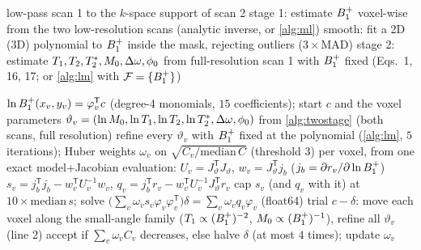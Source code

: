 \begin{algorithm}[!htbp]
\caption{Two-stage reconstruction for a low-resolution scan 2}
\label{alg:twostage}
\begin{algorithmic}[1]
\State low-pass scan 1 to the $k$-space support of scan 2
\State stage 1: estimate $\Bone$ voxel-wise from the two low-resolution scans (analytic inverse, or \cref{alg:ml})
\State smooth: fit a 2D (3D) polynomial to $\Bone$ inside the mask, rejecting outliers ($3\times$MAD)
\State stage 2: estimate $T_1,T_2,T_2^{*},M_0,\Delta\omega,\phi_0$ from full-resolution scan 1 with $\Bone$ fixed (Eqs.~1, 16, 17; or \cref{alg:lm} with $\mathcal F=\{B_1^{+}\}$)
\end{algorithmic}
\end{algorithm}

\begin{algorithm}[!htbp]
\caption{Joint ML with a polynomial $\Bone$ map (Gauss--Newton with variable projection)}
\label{alg:polyb1}
\begin{algorithmic}[1]
\State $\ln B_1^{+}(x_v,y_v)=\varphi_v^{\mathsf T}c$ (degree-4 monomials, $15$ coefficients); start $c$ and the voxel parameters $\vartheta_v=(\ln M_0,\ln T_1,\ln T_2,\ln T_2^{*},\Delta\omega,\phi_0)$ from \cref{alg:twostage} (both scans, full resolution)
\State refine every $\vartheta_v$ with $\Bone$ fixed at the polynomial (\cref{alg:lm}, $5$ iterations); Huber weights $\omega_v$ on $\sqrt{C_v/\mathrm{median}\,C}$ (threshold $3$)
  \State per voxel, from one exact model+Jacobian evaluation: $U_v=J_\vartheta^{\mathsf T}J_\vartheta$, $w_v=J_\vartheta^{\mathsf T}j_b$ ($j_b=\partial r_v/\partial\ln B_1^{+}$)
  \State $s_v=j_b^{\mathsf T}j_b-w_v^{\mathsf T}U_v^{-1}w_v$, \quad $q_v=j_b^{\mathsf T}r_v-w_v^{\mathsf T}U_v^{-1}J_\vartheta^{\mathsf T}r_v$ 
  \State cap $s_v$ (and $q_v$ with it) at $10\times\mathrm{median}\,s$; solve $\big(\sum_v\omega_v s_v\varphi_v\varphi_v^{\mathsf T}\big)\delta=\sum_v\omega_v q_v\varphi_v$ (float64)
  \State trial $c-\delta$: move each voxel along the small-angle family ($T_1\propto(B_1^{+})^{-2}$, $M_0\propto(B_1^{+})^{-1}$), refine all $\vartheta_v$ (line 2)
  \State accept if $\sum_v\omega_vC_v$ decreases, else halve $\delta$ (at most $4$ times); update $\omega_v$
\EndFor
\end{algorithmic}
\end{algorithm}
